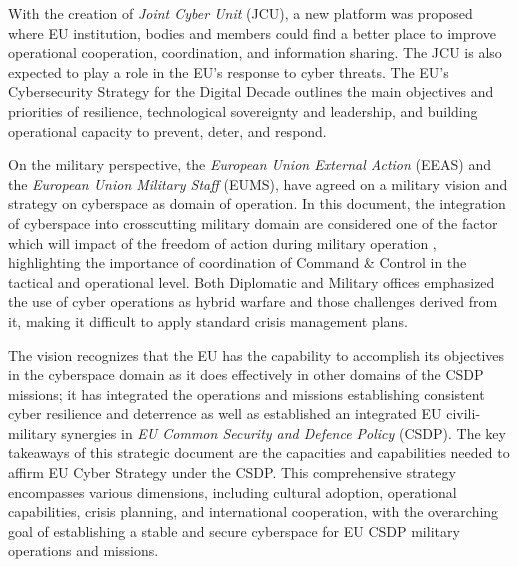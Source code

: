 With the creation of \textit{Joint Cyber Unit} (JCU), a new platform was proposed where EU institution, bodies and members could find a better place to improve operational cooperation, coordination, and information sharing. The JCU is also expected to play a role in the EU's response to cyber threats. The EU's Cybersecurity Strategy for the Digital Decade outlines the main objectives and priorities of resilience, technological sovereignty and leadership, and building operational capacity to prevent, deter, and respond. 

On the military perspective, the \textit{European Union External Action} (EEAS) and the\textit{ European Union Military Staff} (EUMS), have agreed on a military vision and strategy on cyberspace as domain of operation. 
In this document, the integration of cyberspace into crosscutting military domain are considered one of the factor which will impact of the freedom of action during military operation \autocite{eeas_2021_mil}, highlighting the importance of coordination of Command \& Control in the tactical and operational level. Both Diplomatic and Military offices emphasized the use of cyber operations as hybrid warfare and those challenges derived from it, making it difficult to apply standard crisis management plans. 

The vision recognizes that the EU has the capability to accomplish its objectives in the cyberspace domain as it does effectively in other domains of the CSDP missions; it has integrated the operations and missions establishing consistent cyber resilience and deterrence as well as established an integrated EU civili-military synergies in \textit{EU Common Security and Defence Policy} (CSDP).  The key takeaways of this strategic document are the capacities and capabilities needed to affirm EU Cyber Strategy under the CSDP. This comprehensive strategy encompasses various dimensions, including cultural adoption, operational capabilities, crisis planning, and international cooperation, with the overarching goal of establishing a stable and secure cyberspace for EU CSDP military operations and missions.

